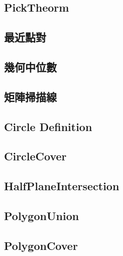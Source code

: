 \subsection{PickTheorm}


\subsection{最近點對}


\subsection{幾何中位數}


\subsection{矩陣掃描線}


\subsection{Circle Definition}


\subsection{CircleCover}


\subsection{HalfPlaneIntersection}


\subsection{PolygonUnion}


\subsection{PolygonCover}



